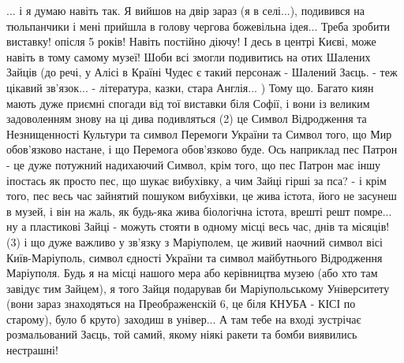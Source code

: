 ... і я думаю навіть так. Я вийшов на двір зараз (я в селі...), подивився на
тюльпанчики і мені прийшла в голову чергова божевільна ідея... Треба зробити
виставку! опісля 5 років! Навіть постійно діючу! І десь в центрі Києві, може
навіть в тому самому музеї! Шоби всі змогли подивитись на отих Шалених Зайців
(до речі, у Алісі в Країні Чудес є такий персонаж - Шалений Заєць. - теж
цікавий зв'язок... - література, казки, стара Англія... )  Тому що. Багато киян
мають дуже приємні спогади від тої виставки біля Софії, і вони із великим
задоволенням знову на ці дива подивляться (2) це Символ Відродження та
Незнищенності Культури та символ Перемоги України та Символ того, що Мир
обов'язково настане, і що Перемога обов'язково буде.  Ось наприклад пес Патрон
- це дуже потужний надихаючий Символ, крім того, що пес Патрон має іншу
іпостась як просто пес, що шукає вибухівку, а чим Зайці гірші за пса? - і крім
того, пес весь час зайнятий пошуком вибухівки, це жива істота, його не засунеш
в музей, і він на жаль, як будь-яка жива біологічна істота, врешті решт
помре... ну а пластикові Зайці - можуть стояти в одному місці весь час, днів та
місяців! (3) і що дуже важливо у зв'язку з Маріуполем, це живий наочний символ
вісі Київ-Маріуполь, символ єдності України та символ майбутнього Відродження
Маріуполя. Будь я на місці нашого мера або керівництва музею (або хто там
завідує тим Зайцем), я того Зайця подарував би Маріупольському Університету
(вони зараз знаходяться на Преображенскій 6, це біля КНУБА - КІСІ по старому),
було б круто) заходиш в універ... А там тебе на вході зустрічає розмальований
Заєць, той самий, якому ніякі ракети та бомби виявились
нестрашні! 

